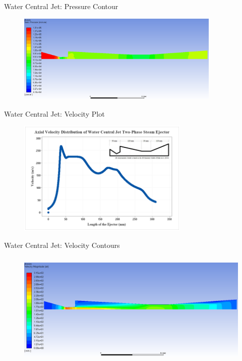 \begin{frame}{Water Central Jet: Pressure Contour}
    \begin{figure}
        \centering
        \includegraphics[height=4.25cm]{images/wcpressureplot.png}
    \end{figure}
\end{frame}

\begin{frame}{Water Central Jet: Velocity Plot}
    \begin{figure}
        \centering
        \includegraphics[height=5.5cm]{images/wcjetvelocity.png}
    \end{figure}
\end{frame}

\begin{frame}{Water Central Jet: Velocity Contours}
    \begin{figure}
        \centering
        \includegraphics[height=5.5cm]{images/wcvelocityair.png}
    \end{figure}
\end{frame}

